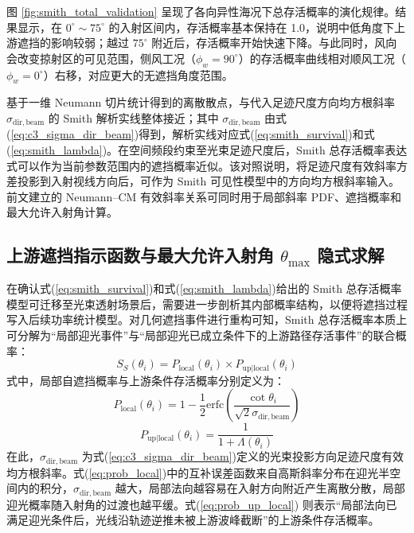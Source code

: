 图 \ref{fig:smith_total_validation} 呈现了各向异性海况下总存活概率的演化规律。结果显示，在 $0^\circ \sim 75^\circ$ 的入射区间内，存活概率基本保持在 1.0，说明中低角度下上游遮挡的影响较弱；越过 $75^\circ$ 附近后，存活概率开始快速下降。与此同时，风向会改变掠射区的可见范围，侧风工况（$\phi_w=90^\circ$）的存活概率曲线相对顺风工况（$\phi_w=0^\circ$）右移，对应更大的无遮挡角度范围。

基于一维 Neumann 切片统计得到的离散散点，与代入足迹尺度方向均方根斜率 $\sigma_{\mathrm{dir},\mathrm{beam}}$ 的 Smith 解析实线整体接近；其中 $\sigma_{\mathrm{dir},\mathrm{beam}}$ 由式(\ref{eq:c3_sigma_dir_beam})得到，解析实线对应式(\ref{eq:smith_survival})和式(\ref{eq:smith_lambda})。在空间频段约束至光束足迹尺度后，Smith 总存活概率表达式可以作为当前参数范围内的遮挡概率近似。该对照说明，将足迹尺度有效斜率方差投影到入射视线方向后，可作为 Smith 可见性模型中的方向均方根斜率输入。前文建立的 Neumann--CM 有效斜率关系可同时用于局部斜率 PDF、遮挡概率和最大允许入射角计算。

\subsection{上游遮挡指示函数与最大允许入射角 \texorpdfstring{$\theta_{\max}$}{theta max} 隐式求解}
\label{subsec:theta_max_derivation}

在确认式(\ref{eq:smith_survival})和式(\ref{eq:smith_lambda})给出的 Smith 总存活概率模型可迁移至光束透射场景后，需要进一步剖析其内部概率结构，以便将遮挡过程写入后续功率统计模型。对几何遮挡事件进行重构可知，Smith 总存活概率本质上可分解为“局部迎光事件”与“局部迎光已成立条件下的上游路径存活事件”的联合概率：
\begin{equation}
	S_S(\theta_i) = P_{\mathrm{local}}(\theta_i) \times P_{\mathrm{up}|\mathrm{local}}(\theta_i)
	\label{eq:smith_decomposition}
\end{equation}
式中，局部自遮挡概率与上游条件存活概率分别定义为：
\begin{equation}
	P_{\mathrm{local}}(\theta_i) = 1 - \frac{1}{2}\mathrm{erfc}\left( \frac{\cot\theta_i}{\sqrt{2}\sigma_{\mathrm{dir},\mathrm{beam}}} \right)
	\label{eq:prob_local}
\end{equation}
\begin{equation}
	P_{\mathrm{up}|\mathrm{local}}(\theta_i) = \frac{1}{1 + \Lambda(\theta_i)}
	\label{eq:prob_up_local}
\end{equation}
在此，$\sigma_{\mathrm{dir},\mathrm{beam}}$ 为式(\ref{eq:c3_sigma_dir_beam})定义的光束投影方向足迹尺度有效均方根斜率。式(\ref{eq:prob_local})中的互补误差函数来自高斯斜率分布在迎光半空间内的积分，$\sigma_{\mathrm{dir},\mathrm{beam}}$ 越大，局部法向越容易在入射方向附近产生离散分散，局部迎光概率随入射角的过渡也越平缓。式(\ref{eq:prob_up_local}) 则表示“局部法向已满足迎光条件后，光线沿轨迹逆推未被上游波峰截断”的上游条件存活概率。

